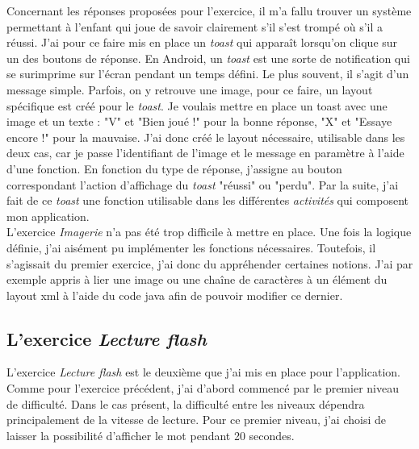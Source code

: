 
Concernant les réponses proposées pour l'exercice, il m'a fallu trouver un système permettant à l'enfant qui joue de savoir clairement s'il s'est trompé où s'il a réussi. J'ai pour ce faire mis en place un \textit{toast} qui apparaît lorsqu'on clique sur un des boutons de réponse. En Android, un \textit{toast} est une sorte de notification qui se surimprime sur l'écran pendant un temps défini. Le plus souvent, il s'agit d'un message simple. Parfois, on y retrouve une image, pour ce faire, un layout spécifique est créé pour le \textit{toast}. Je voulais mettre en place un toast avec une image et un texte : "V" et "Bien joué !" pour la bonne réponse, "X" et "Essaye encore !" pour la mauvaise. J'ai donc créé le layout nécessaire, utilisable dans les deux cas, car je passe l'identifiant de l'image et le message en paramètre à l'aide d'une fonction. En fonction du type de réponse, j'assigne au bouton correspondant l'action d'affichage du \textit{toast} "réussi" ou "perdu". Par la suite, j'ai fait de ce \textit{toast} une fonction utilisable dans les différentes \textit{activités} qui composent mon application.\\

L'exercice \textit{Imagerie} n'a pas été trop difficile à mettre en place. Une fois la logique définie, j'ai aisément pu implémenter les fonctions nécessaires. Toutefois, il s'agissait du premier exercice, j'ai donc du appréhender certaines notions. J'ai par exemple appris à lier une image ou une chaîne de caractères à un élément du layout xml à l'aide du code java afin de pouvoir modifier ce dernier.

\subsection{L'exercice \textit{Lecture flash}}
L'exercice \textit{Lecture flash} est le deuxième que j'ai mis en place pour l'application. Comme pour l'exercice précédent, j'ai d'abord commencé par le premier niveau de difficulté. Dans le cas présent, la difficulté entre les niveaux dépendra principalement de la vitesse de lecture. Pour ce premier niveau, j'ai choisi de laisser la possibilité d'afficher le mot pendant 20 secondes.\\

